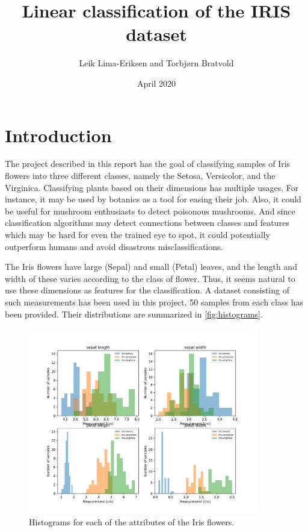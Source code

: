 \documentclass{article}
\begin{document}
\title{Linear classification of the IRIS dataset}
\author{Leik Lima-Eriksen and Torbjørn Bratvold}
\date{April 2020}

\maketitle

\section{Introduction}
The project described in this report has the goal of classifying samples of Iris flowers into
three different classes, namely the Setosa, Versicolor, and the Virginica. Classifying plants
based on their dimensions has multiple usages. For instance, it may be used by botanics as a tool
for easing their job. Also, it could be useful for mushroom enthusiasts to detect poisonous
mushrooms. And since classification algorithms may detect connections between classes and features
which may be hard for even the trained eye to spot, it could potentially outperform humans and
avoid disastrous misclassifications.

The Iris flowers have large (Sepal) and small (Petal) leaves, and the length and width of these
varies according to the class of flower. Thus, it seems natural to use these dimensions as features
for the classification. A dataset consisting of such measurements has been used in this project. 50
samples from each class has been provided. Their distributions are summarized in \autoref{fig:histograms}.

\begin{figure}
    \centering
    \includegraphics[width=0.9\textwidth]{../images/iris_histograms.png}
    \caption{Histograms for each of the attributes of the Iris flowers.}
    \label{fig:histograms}
\end{figure}
\end{document}
